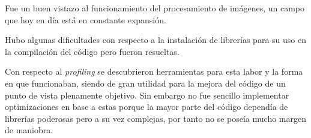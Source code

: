 \documentclass[a4paper]{article}
\begin{document}
Fue un buen vistazo al funcionamiento del procesamiento de imágenes, un campo que hoy en día está en constante expansión.

Hubo algunas dificultades con respecto a la instalación de librerías para su uso en la compilación del código pero fueron resueltas.

Con respecto al \textit{profiling} se descubrieron herramientas para esta labor y la forma en que funcionaban, siendo de gran utilidad para la mejora del código de un punto de vista plenamente objetivo. Sin embargo no fue sencillo implementar optimizaciones en base a estas porque la mayor parte del código dependía de librerías poderosas pero a su vez complejas, por tanto no se poseía mucho margen de maniobra.

\clearpage
%
\end{document}
